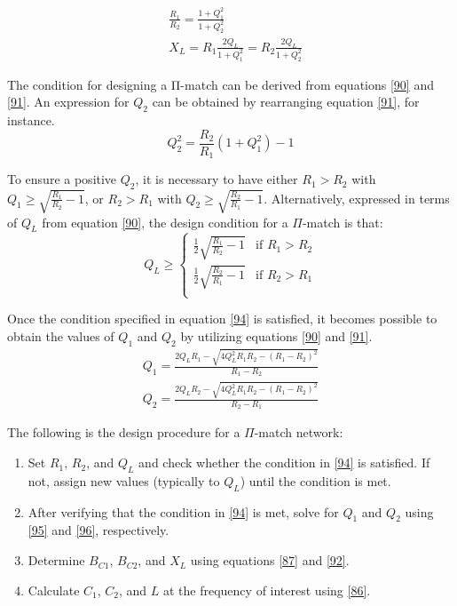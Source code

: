 \begin{align}
    &\frac{R_1}{R_2}=\frac{1+Q_1^2}{1+Q_2^2}\label{91}\\
    &X_L=R_1\frac{2Q_L}{1+Q_1^2}=R_2\frac{2Q_L}{1+Q_2^2}\label{92}
\end{align}

The condition for designing a Π-match can be derived from equations \eqref{90} and \eqref{91}. An expression for $Q_2$ can be obtained by rearranging equation \eqref{91}, for instance.
\begin{equation}
    Q_2^2=\frac{R_2}{R_1}\left(1+Q_1^2\right)-1
\end{equation}

To ensure a positive $Q_2$, it is necessary to have either $R_1> R_2$ with $Q_1\geq \sqrt{\frac{R_1}{R_2}-1}$, or $R_2> R_1$ with $Q_2\geq \sqrt{\frac{R_2}{R_1}-1}$. Alternatively, expressed in terms of $Q_L$ from equation \eqref{90}, the design condition for a $\Pi$-match is that:
\begin{equation}
    Q_L\geq
    \begin{cases}
        \frac{1}{2}\sqrt{\frac{R_1}{R_2}-1} & \text{if } R_1 > R_2 \\
        \frac{1}{2}\sqrt{\frac{R_2}{R_1}-1} & \text{if } R_2 > R_1 \\
    \end{cases}
    \label{94}
\end{equation}

Once the condition specified in equation \eqref{94} is satisfied, it becomes possible to obtain the values of $Q_1$ and $Q_2$ by utilizing equations \eqref{90} and \eqref{91}.
\begin{align}
    Q_1=\frac{2Q_LR_1-\sqrt{4Q_L^2R_1R_2-\left(R_1-R_2\right)^2}}{R_1-R_2}\label{95}\\
     Q_2=\frac{2Q_LR_2-\sqrt{4Q_L^2R_1R_2-\left(R_1-R_2\right)^2}}{R_2-R_1}\label{96}
\end{align}

The following is the design procedure for a $\Pi$-match network:

\begin{enumerate}
\item Set $R_1$, $R_2$, and $Q_L$ and check whether the condition in \eqref{94} is satisfied. If not, assign new values (typically to $Q_L$) until the condition is met.
\item After verifying that the condition in \eqref{94} is met, solve for $Q_1$ and $Q_2$ using \eqref{95} and \eqref{96}, respectively.
\item Determine $B_{C1}$, $B_{C2}$, and $X_L$ using equations \eqref{87} and \eqref{92}.
\item Calculate $C_1$, $C_2$, and $L$ at the frequency of interest using \eqref{86}.
\end{enumerate}

